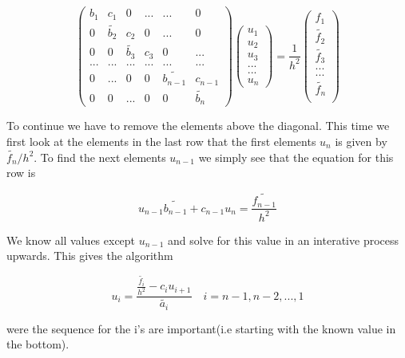 \documentclass[a4paper,11pt]{article}
\begin{document}
{\begin{equation}
\begin{pmatrix}
b_1 & c_1 & 0 & ... & ... & 0 \\
0 & \tilde{b_2} & c_2 & 0 & ... & 0 \\
0 & 0 & \tilde{b_3} & c_3 & 0 & ... \\
... & ... & ... & ... & ... & ... \\
0 & ... & 0 & 0 & \tilde{b_{n-1}} & c_{n-1} \\
0 & 0 & ... & 0 & 0 & \tilde{b_{n}}
\end{pmatrix} \begin{pmatrix}
u_1\\
u_2\\
u_3\\
...\\
...\\
u_n
\end{pmatrix} = \frac{1}{h^2}\begin{pmatrix}
f_1 \\
\tilde{f_2} \\
\tilde{f_3} \\
... \\
... \\
\tilde{f_n} \\
\end{pmatrix}
\end{equation}

To continue we have to remove the elements above the diagonal. This time we first look at the elements in the last row that the first elements $u_n$ is given by $\tilde{f_n}/h^2$. To find the next elements $u_{n-1}$ we simply see that the equation for this row is 

\begin{equation}
	u_{n-1}\tilde{b_{n-1}}+c_{n-1}u_n = \frac{\tilde{f_{n-1}}}{h^2}
\end{equation}

We know all values except $u_{n-1}$ and solve for this value in an interative process upwards. This gives the algorithm 

\begin{equation}
	u_i = \frac{\frac{\tilde{f_i}}{h^2}-c_i u_{i+1}}{\tilde{a_i}}\quad i = n-1, n-2, ..., 1
	\label{eq:forward_general_u}
\end{equation}

were the sequence for the i's are important(i.e starting with the known value in the bottom). 



}
\end{document}
